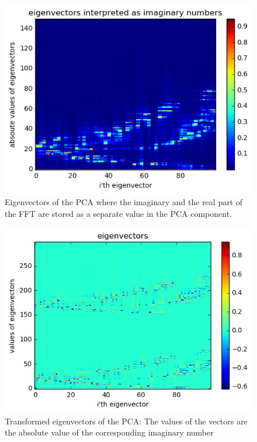 \documentclass[10pt,conference,compsocconf]{IEEEtran}
\begin{document}
\begin{figure}[tbp]
  \centering
  \includegraphics[width=\columnwidth]{figures/pca_eigenvectors_imaginary_numbers.png}
  \caption{Eigenvectors of the PCA where the imaginary and the real part of the FFT are stored as a separate value in the PCA component.}
  \label{fig:pca_eigenvectors_imaginary_numbers}
\end{figure}

\begin{figure}[tbp]
  \centering
  \includegraphics[width=\columnwidth]{figures/pca_eigenvectors.png}
  \caption{Transformed eigenvectors of the PCA: The values of the vectors are the absolute value of the corresponding imaginary number}
  \label{fig:pca_eigenvectors}
\end{figure}
\end{document}
